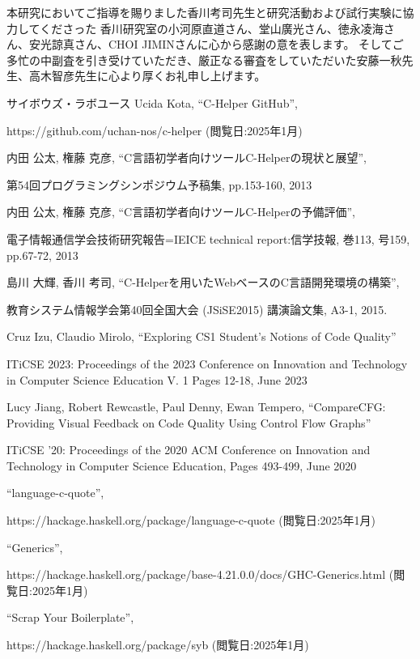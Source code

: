 \documentclass{cssspaper}
\begin{document}
\acknowledgment  %
本研究においてご指導を賜りました香川考司先生と研究活動および試行実験に協力してくださった
香川研究室の小河原直道さん、堂山廣光さん、徳永凌海さん、安光諒真さん、CHOI JIMINさんに心から感謝の意を表します。
そしてご多忙の中副査を引き受けていただき、厳正なる審査をしていただいた安藤一秋先生、高木智彦先生に心より厚くお礼申し上げます。

\begin{thebibliography}{99} %

サイボウズ・ラボユース Ucida Kota, ``C-Helper GitHub'',
    
https://github.com/uchan-nos/c-helper (閲覧日:2025年1月)
    
内田 公太, 権藤 克彦, ``C言語初学者向けツールC-Helperの現状と展望'',
    
第54回プログラミングシンポジウム予稿集, pp.153-160, 2013
    
内田 公太, 権藤 克彦, ``C言語初学者向けツールC-Helperの予備評価'',
    
電子情報通信学会技術研究報告=IEICE technical report:信学技報, 巻113, 号159, pp.67-72, 2013

島川 大輝, 香川 考司, ``C-Helperを用いたWebベースのC言語開発環境の構築'',

教育システム情報学会第40回全国大会 (JSiSE2015) 講演論文集, A3-1, 2015.

Cruz Izu, Claudio Mirolo,
``Exploring CS1 Student's Notions of Code Quality''

ITiCSE 2023: Proceedings of the 2023 Conference on Innovation and Technology in Computer Science Education V. 1 Pages 12-18, June 2023

Lucy Jiang, Robert Rewcastle, Paul Denny, Ewan Tempero, 
``CompareCFG: Providing Visual Feedback on Code Quality Using Control Flow Graphs''

ITiCSE '20: Proceedings of the 2020 ACM Conference on Innovation and Technology in Computer Science Education, Pages 493-499, June 2020

``language-c-quote'',

https://hackage.haskell.org/package/language-c-quote (閲覧日:2025年1月)

``Generics'',

https://hackage.haskell.org/package/base-4.21.0.0/docs/GHC-Generics.html (閲覧日:2025年1月)

``Scrap Your Boilerplate'',

https://hackage.haskell.org/package/syb (閲覧日:2025年1月)


\end{thebibliography}
\end{document}
